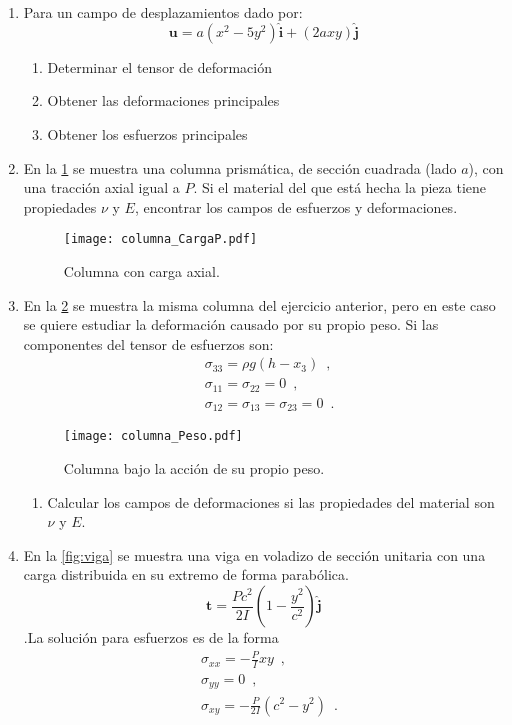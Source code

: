 \documentclass[../notas medios.tex]{subfiles}
\begin{document}
\begin{enumerate}

\item \label{punto01_m} Para un campo de desplazamientos dado por:
\[\mathbf{u} = a(x^2 - 5y^2)\hat{\mathbf{i}} + (2ax y)\hat{\mathbf{j}} \]

\begin{enumerate}
\item Determinar el tensor de deformación
\item Obtener las deformaciones principales
\item Obtener los esfuerzos principales
\end{enumerate}

\item \label{punto02_m}  En la  \cref{columna_CargaP} se muestra una columna prismática, de sección cuadrada (lado $a$), con una tracción axial igual a $P$. Si el material del que está hecha la pieza tiene propiedades $\nu$ y $E$, encontrar los campos de esfuerzos y deformaciones.
\begin{figure}[H]
	\centering
	\texttt{[image: columna\_CargaP.pdf]}
	\caption{Columna con carga axial.}
	\label{columna_CargaP}
\end{figure}

\item \label{punto03_m} En la \cref{fig:columna_g} se muestra la misma columna  del ejercicio anterior, pero en este caso se quiere estudiar la deformación causado por su propio peso. Si las componentes del tensor de esfuerzos son:
\begin{align*}
&\sigma_{33} = \rho g(h- x_{3}) \enspace ,\\
&\sigma_{11} = \sigma_{22} = 0 \enspace ,\\
&\sigma_{12} = \sigma_{13} = \sigma_{23} = 0 \enspace .
\end{align*}

\begin{figure}[h]
	\centering
	\texttt{[image: columna\_Peso.pdf]}
	\caption{Columna bajo la acción de su propio peso.}
	\label{fig:columna_g}
\end{figure}

\begin{enumerate}
\item Calcular los campos de deformaciones si las propiedades del material son $\nu$ y $E$.
\end{enumerate}


\item \label{punto04_m} En la \cref{fig:viga} se muestra una viga en voladizo de sección unitaria con una carga distribuida en su extremo de forma parabólica.
\[\mathbf{t} = \frac{Pc^2}{2I}\left(1-\frac{y^2}{c^2}\right)\hat{\mathbf{j}}\].La solución para esfuerzos es de la forma
\begin{align*}
&\sigma_{xx} = -\frac{P}{I}xy \enspace ,\\
&\sigma_{yy} = 0 \enspace ,\\
&\sigma_{xy} = -\frac{P}{2I}(c^2 - y^2) \enspace .
\end{align*}


\end{enumerate}
\end{document}
